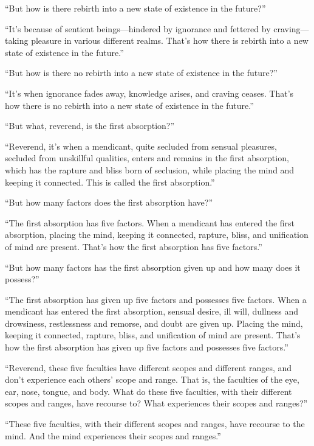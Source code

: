 \documentclass[12pt,openany]{book}%
\begin{document}
“But how is there rebirth into a new state of existence in the future?” 

“It’s because of sentient beings—hindered by ignorance and fettered by craving—taking pleasure in various different realms. That’s how there is rebirth into a new state of existence in the future.” 

“But how is there no rebirth into a new state of existence in the future?” 

“It’s when ignorance fades away, knowledge arises, and craving ceases. That’s how there is no rebirth into a new state of existence in the future.” 

“But what, reverend, is the first absorption?” 

“Reverend, it’s when a mendicant, quite secluded from sensual pleasures, secluded from unskillful qualities, enters and remains in the first absorption, which has the rapture and bliss born of seclusion, while placing the mind and keeping it connected. This is called the first absorption.” 

“But how many factors does the first absorption have?” 

“The first absorption has five factors. When a mendicant has entered the first absorption, placing the mind, keeping it connected, rapture, bliss, and unification of mind are present. That’s how the first absorption has five factors.” 

“But how many factors has the first absorption given up and how many does it possess?” 

“The first absorption has given up five factors and possesses five factors. When a mendicant has entered the first absorption, sensual desire, ill will, dullness and drowsiness, restlessness and remorse, and doubt are given up. Placing the mind, keeping it connected, rapture, bliss, and unification of mind are present. That’s how the first absorption has given up five factors and possesses five factors.” 

“Reverend, these five faculties have different scopes and different ranges, and don’t experience each others’ scope and range. That is, the faculties of the eye, ear, nose, tongue, and body. What do these five faculties, with their different scopes and ranges, have recourse to? What experiences their scopes and ranges?” 

“These five faculties, with their different scopes and ranges, have recourse to the mind. And the mind experiences their scopes and ranges.” 
\end{document}
